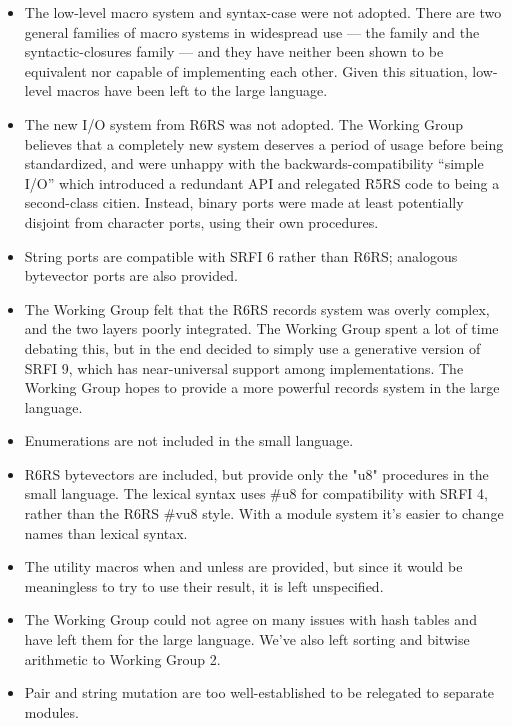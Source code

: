 \begin{itemize}

\item The low-level macro system and {\cf syntax-case} were not adopted. There
are two general families of macro systems in widespread use --- the
{ family and the syntactic-closures} family --- and they have
neither been shown to be equivalent nor capable of implementing each
other. Given this situation,
low-level macros have been left to the large language.

\item The new I/O system from R6RS was not adopted. The Working Group believes that a completely new
system deserves a period of usage before being standardized, and were
unhappy with the backwards-compatibility ``simple I/O'' which introduced
a redundant API and relegated R5RS code to being a second-class
citien.  Instead, binary ports were made at least potentially disjoint from
character ports, using their own procedures.

\item String ports are compatible with SRFI 6 rather than R6RS; analogous
bytevector ports are also provided.

\item The Working Group felt that the R6RS records system was overly complex, and the two layers
poorly integrated. The Working Group spent a lot of time debating this, but in the
end decided to simply use a generative version of SRFI 9, which has
near-universal support among implementations. The Working Group hopes to provide a more
powerful records system in the large language.

\item Enumerations are not included in the small language.

\item R6RS bytevectors are included, but provide only the "u8" procedures in the small
language.  The lexical syntax uses {\cf \#u8} for compatibility
with SRFI 4, rather than the R6RS {\cf \#vu8} style.
With a module system it's easier to change names than lexical syntax.

\item The utility macros {\cf when} and {\cf unless} are provided, but since it would be
meaningless to try to use their result, it is left unspecified.

\item The Working Group could not agree on many issues with hash tables and have left them for
the large language. We've also left sorting and bitwise arithmetic to Working Group 2.

\item Pair and string mutation are too well-established to be relegated to
separate modules.

\end{itemize}

